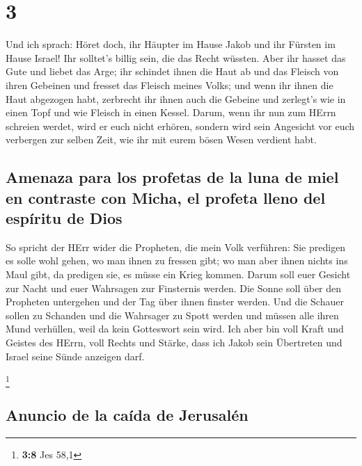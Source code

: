 \hypertarget{section-2}{%
\section{3}\label{section-2}}

 Und ich sprach: Höret doch, ihr Häupter im Hause Jakob
und ihr Fürsten im Hause Israel! Ihr solltet's billig sein, die das
Recht wüssten.  Aber ihr hasset das Gute und liebet das
Arge; ihr schindet ihnen die Haut ab und das Fleisch von ihren Gebeinen
 und fresset das Fleisch meines Volks; und wenn ihr ihnen
die Haut abgezogen habt, zerbrecht ihr ihnen auch die Gebeine und
zerlegt's wie in einen Topf und wie Fleisch in einen Kessel.
 Darum, wenn ihr nun zum HErrn schreien werdet, wird er
euch nicht erhören, sondern wird sein Angesicht vor euch verbergen zur
selben Zeit, wie ihr mit eurem bösen Wesen verdient habt.

\hypertarget{amenaza-para-los-profetas-de-la-luna-de-miel-en-contraste-con-micha-el-profeta-lleno-del-espuxedritu-de-dios}{%
\subsection{Amenaza para los profetas de la luna de miel en contraste
con Micha, el profeta lleno del espíritu de
Dios}\label{amenaza-para-los-profetas-de-la-luna-de-miel-en-contraste-con-micha-el-profeta-lleno-del-espuxedritu-de-dios}}

 So spricht der HErr wider die Propheten, die mein Volk
verführen: Sie predigen es solle wohl gehen, wo man ihnen zu fressen
gibt; wo man aber ihnen nichts ins Maul gibt, da predigen sie, es müsse
ein Krieg kommen.  Darum soll euer Gesicht zur Nacht und
euer Wahrsagen zur Finsternis werden. Die Sonne soll über den Propheten
untergehen und der Tag über ihnen finster werden.  Und die
Schauer sollen zu Schanden und die Wahrsager zu Spott werden und müssen
alle ihren Mund verhüllen, weil da kein Gotteswort sein wird.
 Ich aber bin voll Kraft und Geistes des HErrn, voll
Rechts und Stärke, dass ich Jakob sein Übertreten und Israel seine Sünde
anzeigen darf.

\footnote{\textbf{3:8} Jes 58,1}

\hypertarget{anuncio-de-la-cauxedda-de-jerusaluxe9n}{%
\subsection{Anuncio de la caída de
Jerusalén}\label{anuncio-de-la-cauxedda-de-jerusaluxe9n}}

